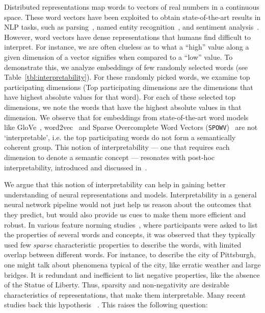 \documentclass[letterpaper]{article} %
\begin{document}
Distributed representations map words to vectors of real numbers in a continuous space.
These word vectors have been exploited to obtain state-of-the-art results in NLP tasks, such as parsing~\cite{bansal2014tailoring}, named entity recognition~\cite{guo2014revisiting}, and sentiment analysis~\cite{socher2013recursive}. 
However, word vectors have dense representations that humans find difficult to interpret. For instance, we are often clueless as to what a ``high'' value along a given dimension of a vector signifies when compared to a ``low'' value. 
To demonstrate this, we analyze embeddings of few randomly selected words (see Table~\ref{tbl:interpretability}). For these randomly picked words, we examine top participating dimensions (Top participating dimensions are the dimensions that have highest absolute values for that word). For each of these selected top dimensions, we note the words that have the highest absolute values in that dimension. We observe that for embeddings from state-of-the-art word models like GloVe~\cite{glove}, word2vec~\cite{mikolov2013distributed} and Sparse Overcomplete Word Vectors (\texttt{SPOWV})~\cite{faruqui2015sparse} are not `interpretable', i.e. the top participating words do not form a semantically coherent group. This notion of interpretability --- one that requires each dimension to denote a semantic concept --- resonates with post-hoc interpretability, introduced and discussed in~\cite{lipton2016mythos}.


We argue that this notion of interpretability can help in gaining better understanding of neural representations and models.
Interpretability in a general neural network pipeline would not just help us reason about the outcomes that they predict, but would also provide us cues to make them more efficient and robust.
In various feature norming studies~\cite{garrard2001prototypicality,mcrae2005semantic,vinson2008semantic}, where participants were asked to list the properties of several words and concepts, it was observed that they typically used few \emph{sparse} characteristic properties to describe the words, with limited overlap between different words. For instance, to describe the city of Pittsburgh, one might talk about phenomena typical of the city, like erratic weather and large bridges. It is redundant and inefficient to list negative properties, like the absence of the Statue of Liberty. Thus, sparsity and non-negativity are desirable characteristics of representations, that make them interpretable. Many recent studies back this hypothesis ~\cite{lee1999learning,murphy2012learning,fyshe2014interpretable,fyshe2015compositional,faruqui2015sparse,danish2016discovering}. This raises the following question:
\end{document}
